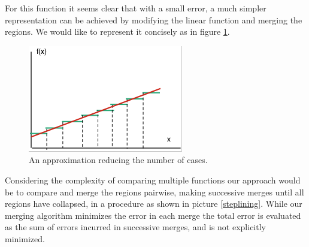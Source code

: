For this function it seems clear that with a small error, a much simpler representation can be achieved by modifying the linear function and merging the regions. We would like to represent it concisely as in figure \ref{steplin}.
\begin{figure}[h]
\center
\includegraphics[scale=0.9]{Figures/steplin.png}
\caption{An approximation reducing the number of cases.}
\label{steplin} 
\end{figure}
Considering the complexity of comparing multiple functions our approach would be to compare and merge the regions pairwise, making successive merges until all regions have collapsed, in a procedure as shown in picture \ref{steplining}. While our merging algorithm minimizes the error in each merge the total error is evaluated as the sum of errors incurred in successive merges, and is not explicitly minimized.

